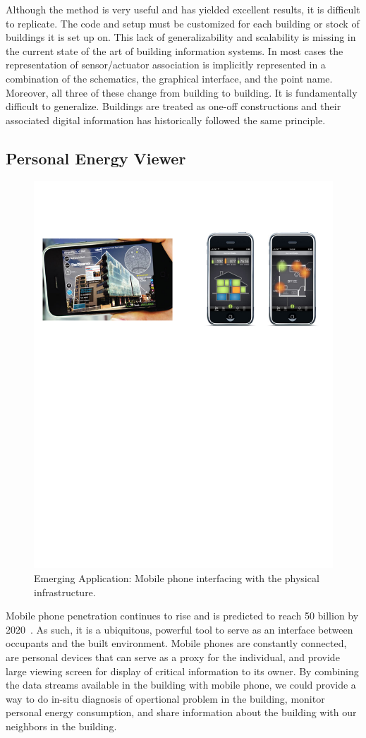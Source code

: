 Although the method is very useful and has yielded excellent results, it is difficult to replicate.  The code and setup must be 
customized for each building or stock of buildings it is set up on.  This lack of generalizability and scalability is missing
in the current state of the art of building information systems.  In most cases the representation of sensor/actuator association is 
implicitly represented in a combination of the schematics, the graphical interface, and the point name.  Moreover, all
three of these change from building to building.  It is fundamentally difficult to generalize.  Buildings are treated as one-off constructions
and their associated digital information has historically followed the same principle.


\subsection{Personal Energy Viewer}
\label{sec:mobile}

\begin{figure}[h!] %
\centering
\includegraphics[width=0.75\columnwidth]{figs/mobileEnergy1}
\caption{Emerging Application: Mobile phone interfacing with the physical infrastructure.}
\label{fig:mobileEnergy1}
\end{figure}

Mobile phone penetration continues to rise and is predicted to reach 50 billion by 2020~\cite{mobile2020}.  As such, it is a ubiquitous,
powerful tool to serve as an interface between occupants and the built environment.  Mobile phones are constantly connected, 
are personal devices that can serve as a proxy for the individual, and provide large viewing screen for display of critical information
to its owner.  By combining the data streams available in the building with mobile phone, we could provide a way to
do in-situ diagnosis of opertional problem in the building, monitor personal energy consumption, and share information about
the building with our neighbors in the building.

